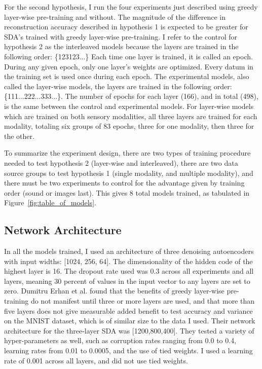 \documentclass[12pt]{article}
\begin{document}
\begin{doublespacing}
	For the second hypothesis, I run the four experiments just described using greedy layer-wise pre-training and without. The magnitude of the difference in reconstruction accuracy described in hypothesis 1 is expected to be greater for SDA's trained with greedy layer-wise pre-training. I refer to the control for hypothesis 2 as the interleaved models because the layers are trained in the following order: \{123123...\} Each time one layer is trained, it is called an epoch. During any given epoch, only one layer's weights are optimized. Every datum in the training set is used once during each epoch. The experimental models, also called the layer-wise models, the layers are trained in the following order: \{111...222...333...\}. The number of epochs for each layer (166), and in total (498), is the same between the control and experimental models. For layer-wise models which are trained on both sensory modalities, all three layers are trained for each modality, totaling six groups of 83 epochs, three for one modality, then three for the other.
	
		To summarize the experiment design, there are two types of training procedure needed to test hypothesis 2 (layer-wise and interleaved), there are two data source groups to test hypothesis 1 (single modality, and multiple modality), and there must be two experiments to control for the advantage given by training order (sound or images last). This gives 8 total models trained, as tabulated in Figure~\ref{fig:table_of_models}. 
	
	
	\subsection{Network Architecture}
	In all the models trained, I used an architecture of three denoising autoencoders with input widths: [1024, 256, 64]. The dimensionality of the hidden code of the highest layer is 16. The dropout rate used was 0.3 across all experiments and all layers, meaning 30 percent of values in the input vector to any layers are set to zero. Dumitru Erhan et al. \cite{erhan2009difficulty} found that the benefits of greedy layer-wise pre-training do not manifest until three or more layers are used, and that more than five layers does not give measurable added benefit to test accuracy and variance on the MNIST dataset, which is of similar size to the data I used. Their network architecture for the three-layer SDA was [1200,800,400]. They tested a variety of hyper-parameters as well, such as corruption rates ranging from 0.0  to 0.4,  learning rates from 0.01 to 0.0005, and the use of tied weights. I used a learning rate of 0.001 across all layers, and did not use tied weights. 
	

\end{doublespacing}
\end{document}
